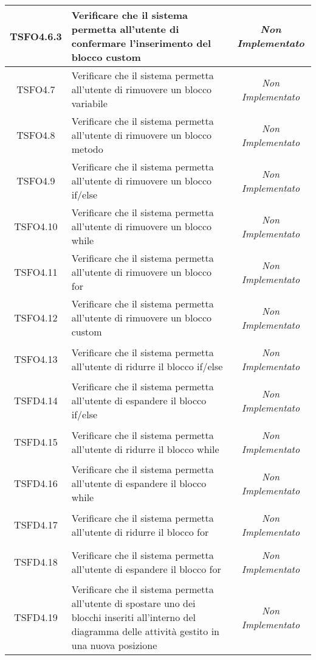\begin{longtable}{|c|>{}m{8cm}|c|}
\hypertarget{TSFO4.6.3}{TSFO4.6.3} & Verificare che il sistema permetta all'utente di confermare l'inserimento del blocco custom & \textit{Non Implementato}\\ \hline
\hypertarget{TSFO4.7}{TSFO4.7} & Verificare che il sistema permetta all'utente di rimuovere un blocco variabile & \textit{Non Implementato}\\ \hline
\hypertarget{TSFO4.8}{TSFO4.8} & Verificare che il sistema permetta all'utente di rimuovere un blocco metodo & \textit{Non Implementato}\\ \hline
\hypertarget{TSFO4.9}{TSFO4.9} & Verificare che il sistema permetta all'utente di rimuovere un blocco if/else & \textit{Non Implementato}\\ \hline
\hypertarget{TSFO4.10}{TSFO4.10} & Verificare che il sistema permetta all'utente di rimuovere un blocco while & \textit{Non Implementato}\\ \hline
\hypertarget{TSFO4.11}{TSFO4.11} & Verificare che il sistema permetta all'utente di rimuovere un blocco for & \textit{Non Implementato}\\ \hline
\hypertarget{TSFO4.12}{TSFO4.12} & Verificare che il sistema permetta all'utente di rimuovere un blocco custom & \textit{Non Implementato}\\ \hline
\hypertarget{TSFO4.13}{TSFO4.13} & Verificare che il sistema permetta all'utente di ridurre il blocco if/else & \textit{Non Implementato}\\ \hline
\hypertarget{TSFD4.14}{TSFD4.14} & Verificare che il sistema permetta all'utente di espandere il blocco if/else & \textit{Non Implementato}\\ \hline
\hypertarget{TSFD4.15}{TSFD4.15} & Verificare che il sistema permetta all'utente di ridurre il blocco while & \textit{Non Implementato}\\ \hline
\hypertarget{TSFD4.16}{TSFD4.16} & Verificare che il sistema permetta all'utente di espandere il blocco while & \textit{Non Implementato}\\ \hline
\hypertarget{TSFD4.17}{TSFD4.17} & Verificare che il sistema permetta all'utente di ridurre il blocco for & \textit{Non Implementato}\\ \hline
\hypertarget{TSFD4.18}{TSFD4.18} & Verificare che il sistema permetta all'utente di espandere il blocco for & \textit{Non Implementato}\\ \hline
\hypertarget{TSFD4.19}{TSFD4.19} & Verificare che il sistema permetta all'utente di spostare uno dei blocchi inseriti all’interno del diagramma delle attività gestito in una nuova posizione & \textit{Non Implementato}\\ \hline

\end{longtable}
